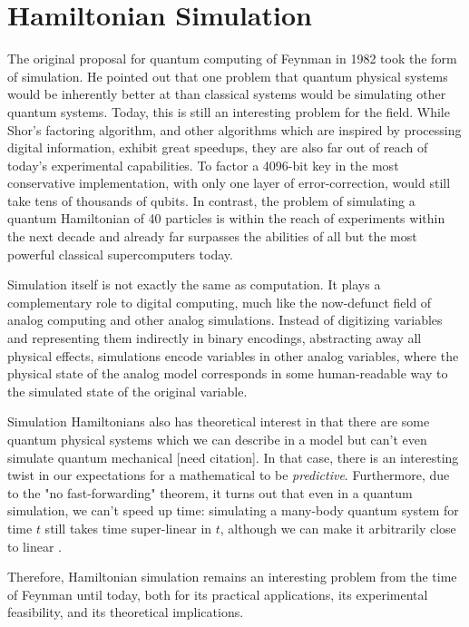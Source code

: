 \section{Hamiltonian Simulation}
\label{sec:hamsim}

The original proposal for quantum computing of Feynman in 1982 \cite{Feynman1982}
took the form of simulation. He pointed out that one problem that
quantum physical systems would be inherently better at than classical systems
would be simulating other quantum systems. Today, this is still an interesting
problem for the field. While Shor's factoring algorithm, and other algorithms
which are inspired by processing digital information, exhibit great speedups,
they are also far out of reach of today's experimental capabilities. To
factor a 4096-bit key in the most conservative implementation, with only
one layer of error-correction, would still take tens of thousands of qubits.
In contrast, the problem of simulating a quantum Hamiltonian of 40 particles
is within the reach of experiments within the next decade and already
far surpasses the abilities of all but the most powerful classical supercomputers
today.

Simulation itself is not exactly the same as computation. It
plays a complementary role to digital computing, much like the
now-defunct field of analog computing and other analog simulations. Instead
of digitizing variables and representing them indirectly in binary
encodings, abstracting away all physical effects, simulations encode variables
in other analog variables, where the physical state of the analog model
corresponds in some human-readable way to the simulated state of the
original variable.

Simulation Hamiltonians also has theoretical interest in that there are some
quantum physical systems which we can describe in a model
but can't even simulate quantum mechanical [need citation]. In that case,
there is an interesting twist in our expectations for a mathematical
to be \emph{predictive}. Furthermore, due to the "no fast-forwarding" theorem,
it turns out that even in a quantum simulation, we can't speed up time:
simulating a many-body quantum system for time $t$ still takes time
super-linear in $t$, although we can make it arbitrarily close to
linear \cite{Berry2005}.

Therefore, Hamiltonian simulation remains an interesting problem from the
time of Feynman until today, both for its practical applications, its
experimental feasibility, and its theoretical implications.

